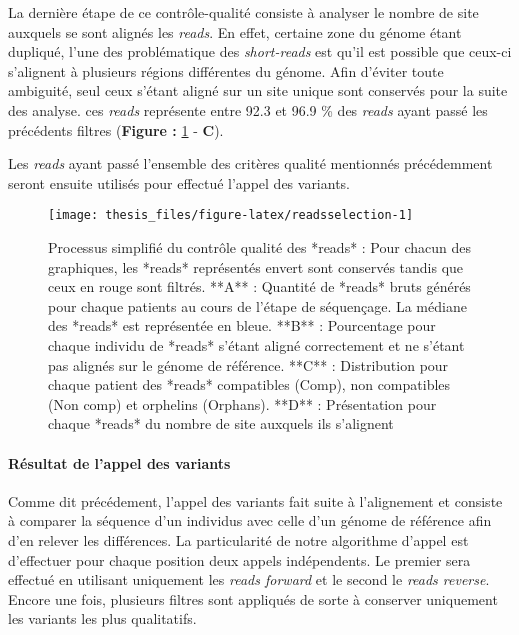 \documentclass[12pt,twoside]{reedthesis}
\theoremstyle{definition}
\theoremstyle{definition}
\theoremstyle{remark}
\begin{document}
  La dernière étape de ce contrôle-qualité consiste à analyser le nombre
  de site auxquels se sont alignés les \emph{reads}. En effet, certaine
  zone du génome étant dupliqué, l'une des problématique des
  \emph{short-reads} est qu'il est possible que ceux-ci s'alignent à
  plusieurs régions différentes du génome. Afin d'éviter toute ambiguité,
  seul ceux s'étant aligné sur un site unique sont conservés pour la suite
  des analyse. ces \emph{reads} représente entre 92.3 et 96.9 \% des
  \emph{reads} ayant passé les précédents filtres (\textbf{Figure :
  }\ref{fig:readsselection} - \textbf{C}).
  
  Les \emph{reads} ayant passé l'ensemble des critères qualité mentionnés
  précédemment seront ensuite utilisés pour effectué l'appel des variants.
  
  \newpage
  
  \begin{figure}
  
  {\centering \texttt{[image: thesis\_files/figure-latex/readsselection-1]} 
  
  }
  
  \caption[Processus simplifié du contrôle qualité des *reads*]{Processus simplifié du contrôle qualité des *reads* : Pour chacun des graphiques, les *reads* représentés envert sont conservés tandis que ceux en rouge sont filtrés. **A** : Quantité de *reads* bruts générés pour chaque patients au cours de l'étape de séquençage. La médiane des *reads* est représentée en bleue. **B** : Pourcentage pour chaque individu de *reads* s'étant aligné correctement et ne s'étant pas alignés sur le génome de référence. **C** : Distribution pour chaque patient des *reads* compatibles (Comp), non compatibles (Non comp) et orphelins (Orphans). **D** : Présentation pour chaque *reads* du nombre de site auxquels ils s'alignent}\label{fig:readsselection}
  \end{figure}
  
  \newpage
  
  \paragraph{Résultat de l'appel des
  variants}\label{resultat-de-lappel-des-variants}
  
  Comme dit précédement, l'appel des variants fait suite à l'alignement et
  consiste à comparer la séquence d'un individus avec celle d'un génome de
  référence afin d'en relever les différences. La particularité de notre
  algorithme d'appel est d'effectuer pour chaque position deux appels
  indépendents. Le premier sera effectué en utilisant uniquement les
  \emph{reads forward} et le second le \emph{reads reverse}. Encore une
  fois, plusieurs filtres sont appliqués de sorte à conserver uniquement
  les variants les plus qualitatifs.
  
\end{document}
